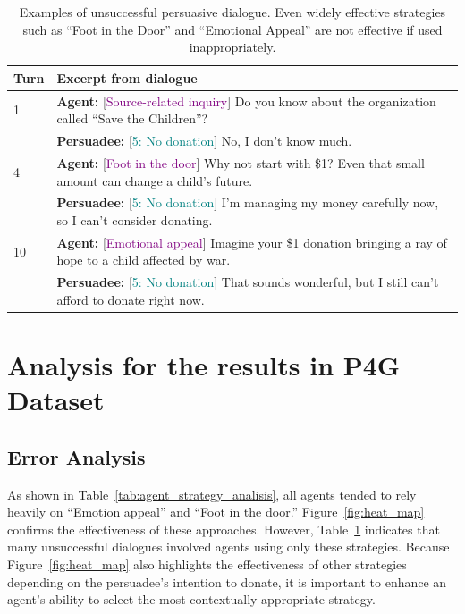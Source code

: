 \documentclass[11pt]{article}
\begin{document}
\begin{table}[t!]
    \tabcolsep 2pt
    \centering
    \footnotesize
    \begin{tabular}{p{0.7cm} p{6.8cm}}
    \toprule
    \textbf{Turn} & \textbf{Excerpt from dialogue} \\
    \midrule
    1 & 
    \textbf{Agent:} [\textcolor{purple}{Source-related inquiry}] Do you know about the organization called ``Save the Children''? \\
      & \textbf{Persuadee:} [\textcolor{teal}{5: No donation}] No, I don't know much. \\
    \midrule
    4 &
    \textbf{Agent:} [\textcolor{purple}{Foot in the door}] Why not start with \$1? Even that small amount can change a child's future. \\
      & \textbf{Persuadee:} [\textcolor{teal}{5: No donation}] I'm managing my money carefully now, so I can't consider donating. \\
    \midrule
    10 &
    \textbf{Agent:} [\textcolor{purple}{Emotional appeal}] Imagine your \$1 donation bringing a ray of hope to a child affected by war. \\
      & \textbf{Persuadee:} [\textcolor{teal}{5: No donation}] That sounds wonderful, but I still can't afford to donate right now. \\
    \bottomrule
    \end{tabular}
    \caption{Examples of unsuccessful persuasive dialogue. Even widely effective strategies such as ``Foot in the Door'' and ``Emotional Appeal'' are not effective if used inappropriately.}
    \label{tab:dialogue_example}
\end{table}

\section{Analysis for the results in P4G Dataset}
\subsection{Error Analysis}
As shown in Table~\ref{tab:agent_strategy_analisis}, all agents tended to rely heavily on ``Emotion appeal'' and ``Foot in the door.''
Figure~\ref{fig:heat_map} confirms the effectiveness of these approaches. 
However, Table~\ref{tab:dialogue_example} indicates that many unsuccessful dialogues involved agents using only these strategies.
Because Figure~\ref{fig:heat_map} also highlights the effectiveness of other strategies depending on the persuadee's intention to donate, it is important to enhance an agent's ability to select the most contextually appropriate strategy.
\end{document}
